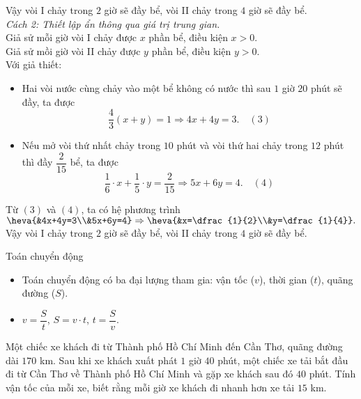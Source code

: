 \begin{vd}
{	Vậy vòi I chảy trong $2$ giờ sẽ đầy bể, vòi II chảy trong $4$ giờ sẽ đầy bể.\\
	\textit{Cách 2: Thiết lập ẩn thông qua giá trị trung gian.}\\
	Giả sử mỗi giờ vòi I chảy được $x$ phần bể, điều kiện $x>0$.\\
	Giả sử mồi giờ vòi II chảy được $y$ phần bể, điều kiện $y>0$.\\
	Với giả thiết:
	\begin{itemize}
	\item Hai vòi nước cùng chảy vào một bể không có nước thì sau $1$ giờ $20$ phút sẽ đầy, ta được $$\dfrac{4}{3}(x+y)=1 \Rightarrow 4x+4y=3. \quad (3)$$
	\item Nếu mở vòi thứ nhất chảy trong $10$ phút và vòi thứ hai chảy trong $12$ phút thì đầy $\dfrac{2}{15}$ bể, ta được $$\dfrac{1}{6}\cdot x+\dfrac{1}{5}\cdot y=\dfrac{2}{15} \Rightarrow 5x+6y=4. \quad (4)$$
	\end{itemize}
	Từ $(3)$ và $(4)$, ta có hệ phương trình $\heva{&4x+4y=3\\&5x+6y=4} \Rightarrow \heva{&x=\dfrac{1}{2}\\&y=\dfrac{1}{4}}.$\\
	Vậy vòi I chảy trong $2$ giờ sẽ đầy bể, vòi II chảy trong $4$ giờ sẽ đầy bể.
	}
\end{vd}
\begin{dang}{Toán chuyển động}
	\begin{itemize}
	\item Toán chuyển động có ba đại lượng tham gia: vận tốc ($v$), thời gian ($t$), quãng đường ($S$).
	\item $v=\dfrac{S}{t}$, $S=v \cdot t$, $t=\dfrac{S}{v}$.
	\end{itemize}
\end{dang}
\begin{vd}Một chiếc xe khách đi từ Thành phố Hồ Chí Minh đến Cần Thơ, quãng đường dài $170$ km. Sau khi xe khách xuất phát $1$ giờ $40$ phút, một chiếc xe tải bắt đầu đi từ Cần Thơ về Thành phố Hồ Chí Minh và gặp xe khách sau đó $40$ phút. Tính vận tốc của mỗi xe, biết rằng mỗi giờ xe khách đi nhanh hơn xe tải $15$ km.
\end{vd}
